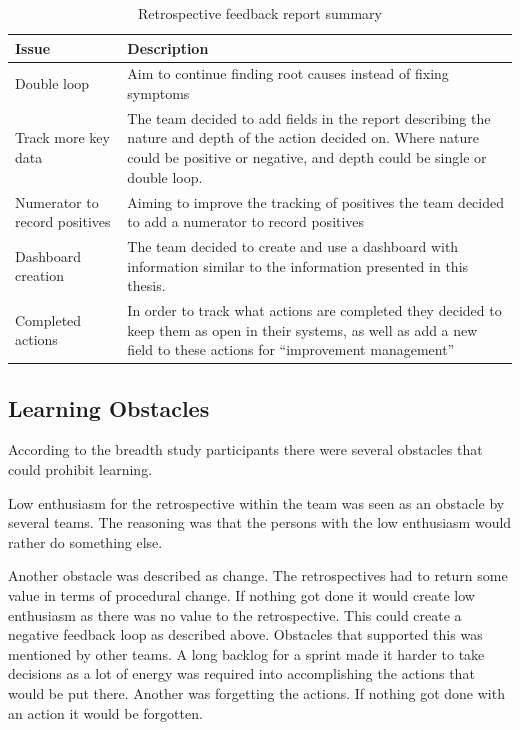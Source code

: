 \begin{table}[!h]
	\begin{center}
	\caption{Retrospective feedback report summary}
	\label{table:Retrospective-Feedback-four}
	\begin{tabular}{ l  p{} }
	\hline
	Issue & Description \\
	\hline
	Double loop & Aim to continue finding root causes instead of fixing symptoms \\
	Track more key data & The team decided to add fields in the report describing the nature and depth of the action decided on. Where nature could be positive or negative, and depth could be single or double loop.\\
	Numerator to record positives & Aiming to improve the tracking of positives the team decided to add a numerator to record positives \\
	Dashboard creation & The team decided to create and use a dashboard with information similar to the information presented in this thesis.  \\
	Completed actions & In order to track what actions are completed they decided to keep them as open in their systems, as well as add a new field to these actions for ``improvement management'' \\
	\hline
	\end{tabular}
	\end{center}
\end{table}

\subsection{Learning Obstacles}
\label{question-14}
According to the breadth study participants there were several obstacles that could prohibit learning. 

Low enthusiasm for the retrospective within the team was seen as an obstacle by several teams. The reasoning was that the persons with the low enthusiasm would rather do something else. 

Another obstacle was described as change. The retrospectives had to return some value in terms of procedural change. If nothing got done it would create low enthusiasm as there was no value to the retrospective. This could create a negative feedback loop as described above. Obstacles that supported this was mentioned by other teams. A long backlog for a sprint made it harder to take decisions as a lot of energy was required into accomplishing the actions that would be put there. Another was forgetting the actions. If nothing got done with an action it would be forgotten.

